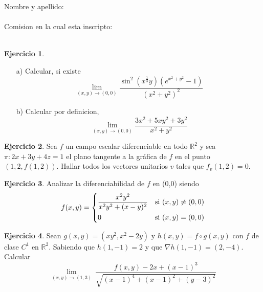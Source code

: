 \documentclass[10pt, a4paper]{report}
\renewcommand{\Re}{\mathbb {R}}
\theoremstyle{definition} %
\newtheorem{question}{Ejercicio}
\begin{document}
Nombre y apellido: \\
\\
Comision en la cual esta inscripto:
\\
\\
\begin{question}

\vspace{1em} %

\begin{itemize}
    \item[a)] Calcular, si existe
    \[
        \lim_{(x,y)\to(0,0)} \frac{\sin^2{(x^{\frac{1}{3}}y)}(e^{x^2+y^2}-1)}{(x^2+y^2)^2}
    \]
     \item[b)] Calcular por definicion,
     \[
        \lim_{(x,y)\to(0,0)} \frac{3x^2+5xy^2+3y^2}{x^2+y^2}
    \]
\end{itemize}



\end{question}

\begin{question}
    Sea $f$ un campo escalar diferenciable en todo $\Re^2$ y sea $\pi:2x+3y+4z=1$ el plano tangente a la gráfica de $f$ en el punto $(1,2,f(1,2))$. Hallar todos los vectores unitarios $v$ tales que $f_v(1,2)=0.$
\end{question}
\begin{question}
    Analizar la diferenciabilidad de $f$ en (0,0) siendo
      \[
        f(x,y) =
        \begin{dcases}
            \frac{x^2y^2}{x^2y^2+(x-y)^2} & \textnormal{si}\ (x,y) \neq (0,0) \\
            0                         & \textnormal{si}\ (x,y) = (0,0)
        \end{dcases}
    \]
\end{question}
\begin{question}
    Sean $g(x,y)=(xy^2,x^2-2y)$ y $h(x,y)=f \circ g(x,y)$ con $f$ de clase $C^1$ en $\Re^2$. Sabiendo que $h(1,-1)=2$ y que $\nabla h(1,-1)=(2,-4)$. Calcular
    \[
        \lim_{(x,y)\to (1,3)} \ 
        \frac{f(x,y)-2x+(x-1)^3}{\sqrt{(x-1)^4+(x-1)^2+(y-3)^2}}       
    \]
\end{question}
\newpage
\end{document}
